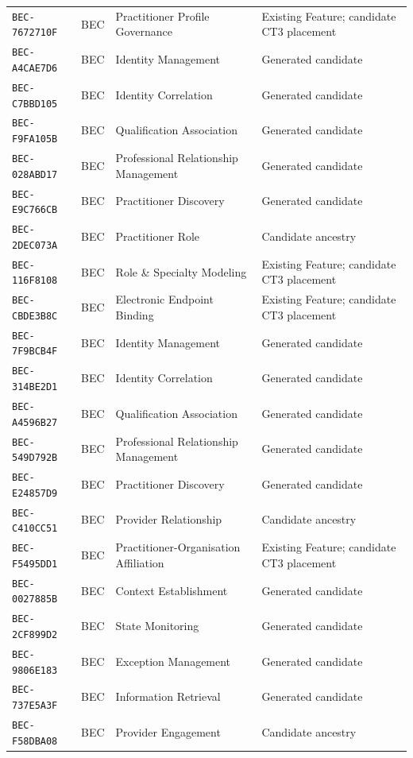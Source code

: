 \documentclass[11pt,a4paper,openany]{book}
\begin{document}
\begin{longtable}{@{}p{.19\linewidth}p{.12\linewidth}p{.39\linewidth}p{.24\linewidth}@{}}
\texttt{BEC-7672710F} & BEC & Practitioner Profile Governance & Existing Feature; candidate CT3 placement \\
\texttt{BEC-A4CAE7D6} & BEC & Identity Management & Generated candidate \\
\texttt{BEC-C7BBD105} & BEC & Identity Correlation & Generated candidate \\
\texttt{BEC-F9FA105B} & BEC & Qualification Association & Generated candidate \\
\texttt{BEC-028ABD17} & BEC & Professional Relationship Management & Generated candidate \\
\texttt{BEC-E9C766CB} & BEC & Practitioner Discovery & Generated candidate \\
\texttt{BEC-2DEC073A} & BEC & Practitioner Role & Candidate ancestry \\
\texttt{BEC-116F8108} & BEC & Role \& Specialty Modeling & Existing Feature; candidate CT3 placement \\
\texttt{BEC-CBDE3B8C} & BEC & Electronic Endpoint Binding & Existing Feature; candidate CT3 placement \\
\texttt{BEC-7F9BCB4F} & BEC & Identity Management & Generated candidate \\
\texttt{BEC-314BE2D1} & BEC & Identity Correlation & Generated candidate \\
\texttt{BEC-A4596B27} & BEC & Qualification Association & Generated candidate \\
\texttt{BEC-549D792B} & BEC & Professional Relationship Management & Generated candidate \\
\texttt{BEC-E24857D9} & BEC & Practitioner Discovery & Generated candidate \\
\texttt{BEC-C410CC51} & BEC & Provider Relationship & Candidate ancestry \\
\texttt{BEC-F5495DD1} & BEC & Practitioner-Organisation Affiliation & Existing Feature; candidate CT3 placement \\
\texttt{BEC-0027885B} & BEC & Context Establishment & Generated candidate \\
\texttt{BEC-2CF899D2} & BEC & State Monitoring & Generated candidate \\
\texttt{BEC-9806E183} & BEC & Exception Management & Generated candidate \\
\texttt{BEC-737E5A3F} & BEC & Information Retrieval & Generated candidate \\
\texttt{BEC-F58DBA08} & BEC & Provider Engagement & Candidate ancestry \\

\end{longtable}
\end{document}
